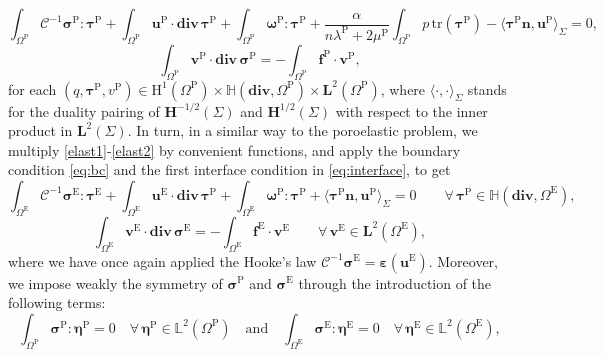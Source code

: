 \documentclass[11pt]{article}
\numberwithin{equation}{section}
\def\b{\boldsymbol}
\newcommand\ff{\boldsymbol{f}}
\newcommand\nn{\boldsymbol{n}}
\newcommand\OmP{\Omega^{\mathrm{P}}}
\newcommand\OmE{\Omega^{\mathrm{E}}}
\numberwithin{equation}{section}
\begin{document}
	\begin{equation}\label{eq:constitutive-poro}
	\int_{\OmP}\mathcal{C}^{-1}\b \sigma^{\mathrm{P}}\colon\b \tau^{\mathrm{P}} + \int_{\OmP} \b u^{\mathrm{P}} \cdot\mathbf{div}\,\b \tau^{\mathrm{P}} + \int_{\OmP} \b \omega^{\mathrm{P}} \colon\b \tau^{\mathrm{P}} + \frac{\alpha}{n\lambda^{\mathrm{P}}+2\mu^{\mathrm{P}}} \int_{\OmP} p\,\mathrm{tr}(\b \tau^{\mathrm{P}}) - \langle\b \tau^{\mathrm{P}}\nn,\b u^{\mathrm{P}}\rangle_{\Sigma} = 0,
	\end{equation}
	\begin{equation}\label{eq:equil-poro}
	\int_{\OmP} \b v^{\mathrm{P}} \cdot\mathbf{div}\,\b \sigma^{\mathrm{P}}  = -\int_{\OmP} \ff^{\mathrm{P}}\cdot \b v^{\mathrm{P}} , 
	\end{equation}
	for each $(q, \b \tau^{\mathrm{P}},v^{\mathrm{P}})\in \mathrm{H}^1(\OmP)\times \mathbb{H}(\mathbf{div},\OmP)\times \mathbf{L}^2(\OmP)$, where $\langle \cdot, \cdot \rangle_{\Sigma}$ stands for the duality pairing of $\mathbf{H}^{-1/2}(\Sigma)$ and $\mathbf{H}^{1/2}(\Sigma)$ with respect to the inner product in $\mathbf{L}^2(\Sigma)$.
	In turn, in a similar way to the poroelastic problem, we multiply \eqref{elast1}-\eqref{elast2} by convenient functions, and apply the boundary condition \eqref{eq:bc} and the first interface condition in \eqref{eq:interface}, to get  
	\begin{equation}\label{eq:constitutive-elast}
	\int_{\OmE}\mathcal{C}^{-1}\b \sigma^{\mathrm{E}}\colon\b \tau^{\mathrm{E}} + \int_{\OmE} \b u^{\mathrm{E}} \cdot\mathbf{div}\,\b \tau^{\mathrm{P}} + \int_{\OmE} \b \omega^{\mathrm{P}} \colon\b \tau^{\mathrm{P}} + \langle\b \tau^{\mathrm{P}}\nn,\b u^{\mathrm{P}}\rangle_{\Sigma} = 0\qquad \forall \, \b \tau^{\mathrm{P}} \in \mathbb{H}(\mathbf{div},\OmE),
	\end{equation}
	\begin{equation}\label{eq:equil-elast}
	\int_{\OmE} \b v^{\mathrm{E}} \cdot\mathbf{div}\,\b \sigma^{\mathrm{E}}  = -\int_{\OmE} \ff^{\mathrm{E}}\cdot \b v^{\mathrm{E}} \qquad \forall \, \b v^{\mathrm{E}} \in \mathbf{L}^2(\OmE),
	\end{equation}
	where we have once again applied the Hooke's law $\mathcal{C}^{-1}\b \sigma^{\mathrm{E}}=\boldsymbol{\varepsilon}(\b u^{\mathrm{E}})$. Moreover, we impose weakly the symmetry of $\b \sigma^{\mathrm{P}}$ and $\b \sigma^{\mathrm{E}}$ through the introduction of the following terms:
	\begin{equation}\label{symmetry-sigma}
	\int_{\OmP}\b \sigma^{\mathrm{P}}\colon\b \eta^{\mathrm{P}} =0 \quad \forall\,\b \eta^{\mathrm{P}} \in \mathbb{L}^2(\OmP)\quad\mathrm{and}\quad \int_{\OmE}\b \sigma^{\mathrm{E}}\colon\b \eta^{\mathrm{E}} =0 \quad \forall\,\b \eta^{\mathrm{E}} \in \mathbb{L}^2(\OmE),
	\end{equation} 
\end{document}
